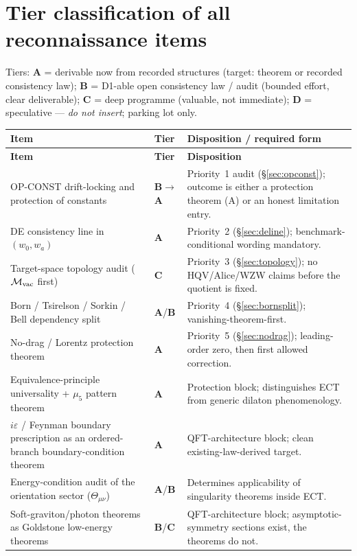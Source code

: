 \documentclass[11pt,a4paper]{article}
\newcommand{\TA}{\textbf{A}}\newcommand{\TB}{\textbf{B}}\newcommand{\TC}{\textbf{C}}\newcommand{\TD}{\textbf{D}}
\begin{document}
\section{Tier classification of all reconnaissance items}
Tiers: \TA{} = derivable now from recorded structures (target: theorem or recorded
consistency law); \TB{} = D1-able open consistency law / audit (bounded effort, clear
deliverable); \TC{} = deep programme (valuable, not immediate); \TD{} = speculative ---
\emph{do not insert}; parking lot only.

\renewcommand{\arraystretch}{1.15}\small
\begin{longtable}{@{}p{6.0cm}p{1.0cm}p{8.0cm}@{}}
\toprule \textbf{Item} & \textbf{Tier} & \textbf{Disposition / required form} \\ \midrule
\endfirsthead
\toprule \textbf{Item} & \textbf{Tier} & \textbf{Disposition} \\ \midrule \endhead
\bottomrule \endfoot
OP-CONST drift-locking and protection of constants & \TB$\to$\TA & Priority~1 audit
(\S\ref{sec:opconst}); outcome is either a protection theorem (A) or an honest
limitation entry. \\
DE consistency line in $(w_0,w_a)$ & \TA & Priority~2 (\S\ref{sec:deline});
benchmark-conditional wording mandatory. \\
Target-space topology audit ($\mathcal M_{\rm vac}$ first) & \TC & Priority~3
(\S\ref{sec:topology}); no HQV/Alice/WZW claims before the quotient is fixed. \\
Born / Tsirelson / Sorkin / Bell dependency split & \TA/\TB & Priority~4
(\S\ref{sec:bornsplit}); vanishing-theorem-first. \\
No-drag / Lorentz protection theorem & \TA & Priority~5 (\S\ref{sec:nodrag});
leading-order zero, then first allowed correction. \\
Equivalence-principle universality + $\mu_5$ pattern theorem & \TA & Protection block;
distinguishes ECT from generic dilaton phenomenology. \\
$i\varepsilon$ / Feynman boundary prescription as an ordered-branch
boundary-condition theorem & \TA & QFT-architecture block; clean
existing-law-derived target. \\
Energy-condition audit of the orientation sector ($\Theta_{\mu\nu}$) & \TA/\TB &
Determines applicability of singularity theorems inside ECT. \\
Soft-graviton/photon theorems as Goldstone low-energy theorems & \TB/\TC &
QFT-architecture block; asymptotic-symmetry sections exist, the theorems do not. \\

\end{longtable}
\end{document}
